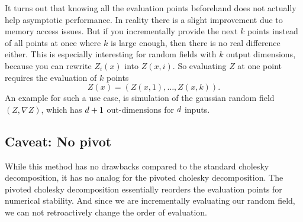 It turns out that knowing all the evaluation points beforehand does not actually
help asymptotic performance. In reality there is a slight improvement due to
memory access issues. But if you incrementally provide the next \(k\) points
instead of all points at once where \(k\) is large enough, then there is no
real difference either. This is especially interesting for random fields with
\(k\) output dimensions, because you can rewrite \(Z_i(x)\) into \(Z(x,i)\). So
evaluating \(Z\) at one point requires the evaluation of \(k\) points
\[
	Z(x) = (Z(x,1),\dots,Z(x,k)).
\]
An example for such a use case, is simulation of the gaussian random field
\((Z,\nabla Z)\), which has \(d+1\) out-dimensions for \(d\)
inputs.

\subsection{Caveat: No pivot}

While this method has no drawbacks compared to the standard cholesky
decomposition, it has no analog for the pivoted cholesky decomposition. The
pivoted cholesky decomposition essentially reorders the evaluation points for
numerical stability. And since we are incrementally evaluating our random field,
we can not retroactively change the order of evaluation.

